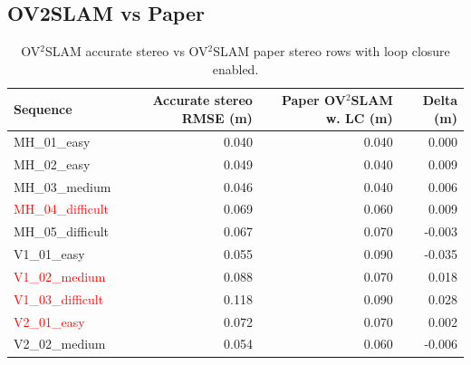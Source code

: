 \documentclass[11pt]{article}
\begin{document}
\subsection{OV2SLAM vs Paper}

\begin{table}[H]
\centering
\small
\caption{OV$^{2}$SLAM accurate stereo vs OV$^{2}$SLAM paper stereo rows with loop closure enabled.}
\label{tab:ov2_accurate_vs_paper}
\begin{tabular}{lrrr}
\toprule
Sequence & Accurate stereo RMSE (m) & Paper OV$^{2}$SLAM w. LC (m) & Delta (m) \\
\midrule
MH\_01\_easy & 0.040 & 0.040 & 0.000 \\
MH\_02\_easy & 0.049 & 0.040 & 0.009 \\
MH\_03\_medium & 0.046 & 0.040 & 0.006 \\
\textcolor{red}{MH\_04\_difficult} & 0.069 & 0.060 & 0.009 \\
MH\_05\_difficult & 0.067 & 0.070 & -0.003 \\
V1\_01\_easy & 0.055 & 0.090 & -0.035 \\
\textcolor{red}{V1\_02\_medium} & 0.088 & 0.070 & 0.018 \\
\textcolor{red}{V1\_03\_difficult} & 0.118 & 0.090 & 0.028 \\
\textcolor{red}{V2\_01\_easy} & 0.072 & 0.070 & 0.002 \\
V2\_02\_medium & 0.054 & 0.060 & -0.006 \\
\bottomrule
\end{tabular}
\end{table}
\end{document}
